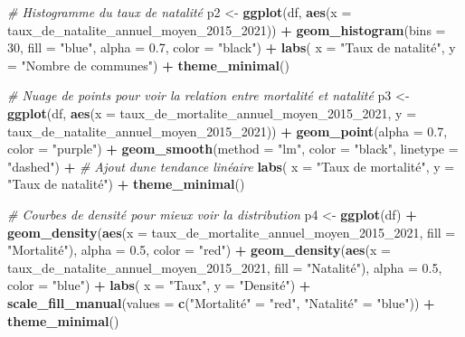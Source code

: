 \documentclass[
]{article}
\newenvironment{Shaded}{\begin{snugshade}}{\end{snugshade}}
\newcommand{\AttributeTok}[1]{\textcolor[rgb]{0.13,0.29,0.53}{#1}}
\newcommand{\CommentTok}[1]{\textcolor[rgb]{0.56,0.35,0.01}{\textit{#1}}}
\newcommand{\DecValTok}[1]{\textcolor[rgb]{0.00,0.00,0.81}{#1}}
\newcommand{\FloatTok}[1]{\textcolor[rgb]{0.00,0.00,0.81}{#1}}
\newcommand{\FunctionTok}[1]{\textcolor[rgb]{0.13,0.29,0.53}{\textbf{#1}}}
\newcommand{\NormalTok}[1]{#1}
\newcommand{\OtherTok}[1]{\textcolor[rgb]{0.56,0.35,0.01}{#1}}
\newcommand{\SpecialCharTok}[1]{\textcolor[rgb]{0.81,0.36,0.00}{\textbf{#1}}}
\newcommand{\StringTok}[1]{\textcolor[rgb]{0.31,0.60,0.02}{#1}}
\begin{document}
\begin{Shaded}
\begin{Highlighting}[]
\CommentTok{\#  Histogramme du taux de natalité}
\NormalTok{p2 }\OtherTok{\textless{}{-}} \FunctionTok{ggplot}\NormalTok{(df, }\FunctionTok{aes}\NormalTok{(}\AttributeTok{x =}\NormalTok{ taux\_de\_natalite\_annuel\_moyen\_2015\_2021)) }\SpecialCharTok{+}
  \FunctionTok{geom\_histogram}\NormalTok{(}\AttributeTok{bins =} \DecValTok{30}\NormalTok{, }\AttributeTok{fill =} \StringTok{"blue"}\NormalTok{, }\AttributeTok{alpha =} \FloatTok{0.7}\NormalTok{, }\AttributeTok{color =} \StringTok{"black"}\NormalTok{) }\SpecialCharTok{+}
  \FunctionTok{labs}\NormalTok{(}
       \AttributeTok{x =} \StringTok{"Taux de natalité"}\NormalTok{, }
       \AttributeTok{y =} \StringTok{"Nombre de communes"}\NormalTok{) }\SpecialCharTok{+}
  \FunctionTok{theme\_minimal}\NormalTok{()}

\CommentTok{\#  Nuage de points pour voir la relation entre mortalité et natalité}
\NormalTok{p3 }\OtherTok{\textless{}{-}} \FunctionTok{ggplot}\NormalTok{(df, }\FunctionTok{aes}\NormalTok{(}\AttributeTok{x =}\NormalTok{ taux\_de\_mortalite\_annuel\_moyen\_2015\_2021, }
                     \AttributeTok{y =}\NormalTok{ taux\_de\_natalite\_annuel\_moyen\_2015\_2021)) }\SpecialCharTok{+}
  \FunctionTok{geom\_point}\NormalTok{(}\AttributeTok{alpha =} \FloatTok{0.7}\NormalTok{, }\AttributeTok{color =} \StringTok{"purple"}\NormalTok{) }\SpecialCharTok{+}
  \FunctionTok{geom\_smooth}\NormalTok{(}\AttributeTok{method =} \StringTok{"lm"}\NormalTok{, }\AttributeTok{color =} \StringTok{"black"}\NormalTok{, }\AttributeTok{linetype =} \StringTok{"dashed"}\NormalTok{) }\SpecialCharTok{+}  \CommentTok{\# Ajout d\textquotesingle{}une tendance linéaire}
  \FunctionTok{labs}\NormalTok{(}
       \AttributeTok{x =} \StringTok{"Taux de mortalité"}\NormalTok{,}
       \AttributeTok{y =} \StringTok{"Taux de natalité"}\NormalTok{) }\SpecialCharTok{+}
  \FunctionTok{theme\_minimal}\NormalTok{()}

\CommentTok{\#  Courbes de densité pour mieux voir la distribution}
\NormalTok{p4 }\OtherTok{\textless{}{-}} \FunctionTok{ggplot}\NormalTok{(df) }\SpecialCharTok{+}
  \FunctionTok{geom\_density}\NormalTok{(}\FunctionTok{aes}\NormalTok{(}\AttributeTok{x =}\NormalTok{ taux\_de\_mortalite\_annuel\_moyen\_2015\_2021, }\AttributeTok{fill =} \StringTok{"Mortalité"}\NormalTok{), }\AttributeTok{alpha =} \FloatTok{0.5}\NormalTok{, }\AttributeTok{color =} \StringTok{"red"}\NormalTok{) }\SpecialCharTok{+}
  \FunctionTok{geom\_density}\NormalTok{(}\FunctionTok{aes}\NormalTok{(}\AttributeTok{x =}\NormalTok{ taux\_de\_natalite\_annuel\_moyen\_2015\_2021, }\AttributeTok{fill =} \StringTok{"Natalité"}\NormalTok{), }\AttributeTok{alpha =} \FloatTok{0.5}\NormalTok{, }\AttributeTok{color =} \StringTok{"blue"}\NormalTok{) }\SpecialCharTok{+}
  \FunctionTok{labs}\NormalTok{(}
       \AttributeTok{x =} \StringTok{"Taux"}\NormalTok{,}
       \AttributeTok{y =} \StringTok{"Densité"}\NormalTok{) }\SpecialCharTok{+}
  \FunctionTok{scale\_fill\_manual}\NormalTok{(}\AttributeTok{values =} \FunctionTok{c}\NormalTok{(}\StringTok{"Mortalité"} \OtherTok{=} \StringTok{"red"}\NormalTok{, }\StringTok{"Natalité"} \OtherTok{=} \StringTok{"blue"}\NormalTok{)) }\SpecialCharTok{+}
  \FunctionTok{theme\_minimal}\NormalTok{()}


\end{Highlighting}
\end{Shaded}
\end{document}
